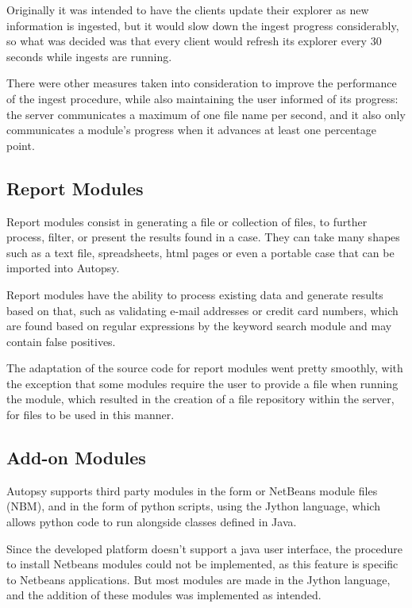 Originally it was intended to have the clients update their explorer as new information is ingested, but it would slow down the ingest progress considerably, so what was decided was that every client would refresh 
its explorer every 30 seconds while ingests are running.

There were other measures taken into consideration to improve the performance of the ingest procedure, while also maintaining the user informed of its progress: the server communicates a maximum of one file name per
second, and it also only communicates a module's progress when it advances at least one percentage point.

\subsection{Report Modules}

Report modules consist in generating a file or collection of files, to further process, filter, or present the results found in a case. They can take many shapes such as a text file, spreadsheets, \acrshort{html} pages or even a portable case that can be imported into Autopsy.

Report modules have the ability to process existing data and generate results based on that, such as validating e-mail addresses or credit card numbers, 
which are found based on regular expressions by the keyword search module and may contain false positives.

The adaptation of the source code for report modules went pretty smoothly, with the exception that some modules require the user to provide a file when running the module, which resulted in the creation of a file repository within the server, for files to be used in this manner.

\subsection{Add-on Modules}

Autopsy supports third party modules in the form or NetBeans \cite{netbeans} module files (NBM), and in the form of python scripts, using the Jython language, which allows python code to run alongside classes defined in Java.

Since the developed platform doesn't support a java user interface, the procedure to install Netbeans modules could not be implemented, as this feature is specific to Netbeans applications. 
But most modules are made in the Jython language, and the addition of these modules was implemented as intended.

